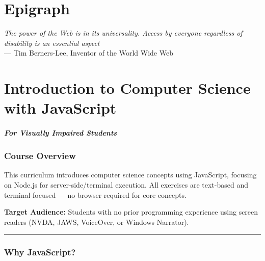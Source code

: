 \documentclass[
  justified,
  openright,
]{tufte-book}
\let\subsubsection\paragraph
\let\paragraph\paragraph
\let\subsubsection\paragraph
\let\paragraph\paragraph
\begin{document}
\chapter*{Epigraph}
\thispagestyle{empty}
\begin{flushright}
  \vspace*{0.25\textheight}
  {\itshape The power of the Web is in its universality. Access by everyone regardless of disability is an essential aspect}\\[1em]
  --- Tim Berners-Lee, Inventor of the World Wide Web
\end{flushright}
\clearpage

\newpage

\mainmatter
{} %


\chapter*{Introduction to Computer Science with JavaScript}

\subsubsection{For Visually Impaired
Students}\label{for-visually-impaired-students}

\subsection{Course Overview}\label{course-overview}

This curriculum introduces computer science concepts using JavaScript,
focusing on Node.js for server-side/terminal execution. All exercises
are text-based and terminal-focused --- no browser required for core
concepts.

\textbf{Target Audience:} Students with no prior programming experience
using screen readers (NVDA, JAWS, VoiceOver, or Windows Narrator).

\begin{center}\rule{0.5\linewidth}{0.5pt}\end{center}

\subsection{Why JavaScript?}\label{why-javascript}
\end{document}
